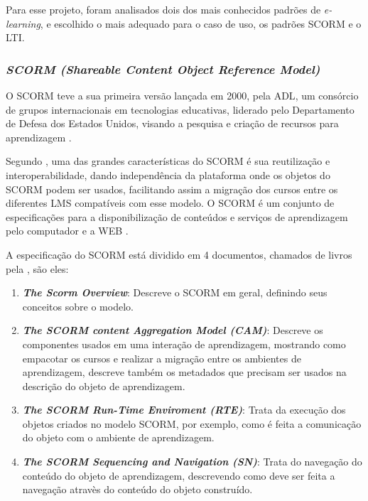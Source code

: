 Para esse projeto, foram analisados dois dos mais conhecidos padrões de \textit{e-learning}, e escolhido o mais adequado para o caso de uso, os padrões \ac{SCORM} e o \ac{LTI}.

\subsubsection{\textit{SCORM (Shareable Content Object Reference Model)}}
O \ac{SCORM} teve a sua primeira versão lançada em 2000, pela \ac{ADL}, um consórcio de grupos internacionais em tecnologias educativas, liderado pelo Departamento de Defesa dos Estados Unidos, visando a pesquisa e criação de recursos para aprendizagem \cite{adl}.

Segundo , uma das grandes características do \ac{SCORM} é sua reutilização e interoperabilidade, dando independência da plataforma onde os objetos do SCORM podem ser usados, facilitando assim a migração dos cursos entre os diferentes \ac{LMS} compatíveis com esse modelo. O \ac{SCORM} é um conjunto de especificações para a disponibilização de conteúdos e serviços de aprendizagem pelo computador e a \ac{WEB} \cite{adl}.

A especificação do \ac{SCORM} está dividido em 4 documentos, chamados de livros pela \cite{adl}, são eles:
\begin{enumerate}
  \item \textbf{\textit{The Scorm Overview}}: Descreve o \ac{SCORM} em geral, definindo seus conceitos sobre o modelo.
  \item \textbf{\textit{The SCORM content Aggregation Model (CAM)}}: Descreve os componentes usados em uma interação de aprendizagem, mostrando como empacotar os cursos e realizar a migração entre os ambientes de aprendizagem, descreve também os metadados que precisam ser usados na descrição do objeto de aprendizagem.
  \item \textbf{\textit{The SCORM Run-Time Enviroment (RTE)}}: Trata da execução dos objetos criados no modelo \ac{SCORM}, por exemplo, como é feita a comunicação do objeto com o ambiente de aprendizagem.
  \item \textbf{\textit{The SCORM Sequencing and Navigation (SN)}}: Trata do navegação do conteúdo do objeto de aprendizagem, descrevendo como deve ser feita a navegação atravès do conteúdo do objeto construído.
\end{enumerate}

